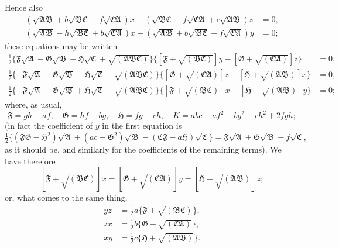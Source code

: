 \documentclass[11pt,a4paper]{book}
\begin{document}
Hence also
\begin{align*}
(\sqrt{\mathfrak{A}\mathfrak{B}} + b\sqrt{\mathfrak{B}\mathfrak{C}} - f\sqrt{\mathfrak{C}\mathfrak{A}})x - (\sqrt{\mathfrak{B}\mathfrak{C}} - f\sqrt{\mathfrak{C}\mathfrak{A}} + c\sqrt{\mathfrak{A}\mathfrak{B}})z &= 0, \\
(\sqrt{\mathfrak{A}\mathfrak{B}} - h\sqrt{\mathfrak{B}\mathfrak{C}} + b\sqrt{\mathfrak{C}\mathfrak{A}})x - (\sqrt{\mathfrak{A}\mathfrak{B}} + b\sqrt{\mathfrak{B}\mathfrak{C}} + f\sqrt{\mathfrak{C}\mathfrak{A}})y &= 0;
\end{align*}
these equations may be written
\begin{align*}
\tfrac{1}{2}\{\mathfrak{F}\sqrt{\mathfrak{A}} - \mathfrak{G}\sqrt{\mathfrak{B}} - \mathfrak{H}\sqrt{\mathfrak{C}} + \sqrt{(\mathfrak{A}\mathfrak{B}\mathfrak{C})}\}\{[\mathfrak{F} + \sqrt{(\mathfrak{B}\mathfrak{C})}]y - [\mathfrak{G} + \sqrt{(\mathfrak{C}\mathfrak{A})}]z\} &= 0, \\
\tfrac{1}{2}\{-\mathfrak{F}\sqrt{\mathfrak{A}} + \mathfrak{G}\sqrt{\mathfrak{B}} - \mathfrak{H}\sqrt{\mathfrak{C}} + \sqrt{(\mathfrak{A}\mathfrak{B}\mathfrak{C})}\}\{[\mathfrak{G} + \sqrt{(\mathfrak{C}\mathfrak{A})}]z - [\mathfrak{H} + \sqrt{(\mathfrak{A}\mathfrak{B})}]x\} &= 0, \\
\tfrac{1}{2}\{-\mathfrak{F}\sqrt{\mathfrak{A}} - \mathfrak{G}\sqrt{\mathfrak{B}} + \mathfrak{H}\sqrt{\mathfrak{C}} + \sqrt{(\mathfrak{A}\mathfrak{B}\mathfrak{C})}\}\{[\mathfrak{F} + \sqrt{(\mathfrak{B}\mathfrak{C})}]x - [\mathfrak{H} + \sqrt{(\mathfrak{A}\mathfrak{B})}]y\} &= 0;
\end{align*}
where, as usual,
\[
\mathfrak{F} = gh - af, \quad \mathfrak{G} = hf - bg, \quad \mathfrak{H} = fg - ch, \quad K = abc - af^{2} - bg^{2} - ch^{2} + 2fgh;
\]
(in fact the coefficient of $y$ in the first equation is
\[
\tfrac{1}{2}\{(\mathfrak{F}\mathfrak{G} - \mathfrak{H}^{2})\sqrt{\mathfrak{A}} + (ac - \mathfrak{G}^{2})\sqrt{\mathfrak{B}} - (\mathfrak{C}\mathfrak{F} - a\mathfrak{H})\sqrt{\mathfrak{C}}\} = \mathfrak{F}\sqrt{\mathfrak{A}} + \mathfrak{G}\sqrt{\mathfrak{B}} - f\sqrt{\mathfrak{C}},
\]
as it should be, and similarly for the coefficients of the remaining terms). We have therefore
\[
[\mathfrak{F} + \sqrt{(\mathfrak{B}\mathfrak{C})}]x = [\mathfrak{G} + \sqrt{(\mathfrak{C}\mathfrak{A})}]y = [\mathfrak{H} + \sqrt{(\mathfrak{A}\mathfrak{B})}]z;
\]
or, what comes to the same thing,
\begin{align*}
yz &= \tfrac{1}{2}a\{\mathfrak{F} + \sqrt{(\mathfrak{B}\mathfrak{C})}\}, \\
zx &= \tfrac{1}{2}b\{\mathfrak{G} + \sqrt{(\mathfrak{C}\mathfrak{A})}\}, \\
xy &= \tfrac{1}{2}c\{\mathfrak{H} + \sqrt{(\mathfrak{A}\mathfrak{B})}\}.
\end{align*}
\end{document}
